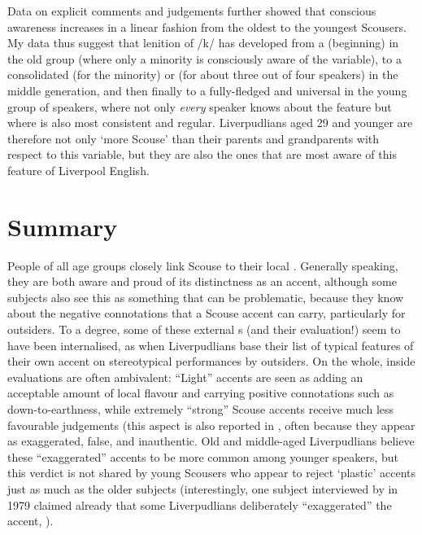 Data on explicit comments and judgements further showed that conscious awareness increases in a linear fashion from the oldest to the youngest Scousers.
My data thus suggest that lenition of /k/ has developed from a (beginning)  in the old group (where only a minority is consciously aware of the variable), to a consolidated  (for the minority) or  (for about three out of four speakers) in the middle generation, and then finally to a fully-fledged and universal  in the young group of speakers, where not only \emph{every} speaker knows about the feature but where  is also most consistent and regular.
Liverpudlians aged 29 and younger are therefore not only `more Scouse' than their parents and grandparents with respect to this variable, but they are also the ones that are most aware of this feature of Liverpool English.

\section{Summary}
\label{prod.disc.summary}

People of all age groups closely link Scouse to their local .
Generally speaking, they are both aware and proud of its distinctness as an accent, although some subjects also see this as something that can be problematic, because they know about the negative connotations that a Scouse accent can carry, particularly for outsiders.
To a degree, some of these external s (and their evaluation!) seem to have been internalised, as when Liverpudlians base their list of typical features of their own accent on stereotypical performances by outsiders.
On the whole, inside evaluations are often ambivalent: ``Light'' accents are seen as adding an acceptable amount of local flavour and carrying positive connotations such as down-to-earthness, while extremely ``strong'' Scouse accents receive much less favourable judgements (this aspect is also reported in \citealt[33]{delyon1981}, often because they appear as exaggerated, false, and inauthentic.
Old and middle-aged Liverpudlians believe these ``exaggerated'' accents to be more common among younger speakers, but this verdict is not shared by young Scousers who appear to reject `plastic' accents just as much as the older subjects (interestingly, one subject interviewed by \citeauthor{delyon1981} in 1979 claimed already that some Liverpudlians deliberately ``exaggerated'' the accent, \citealt[cf.][30]{delyon1981}).

